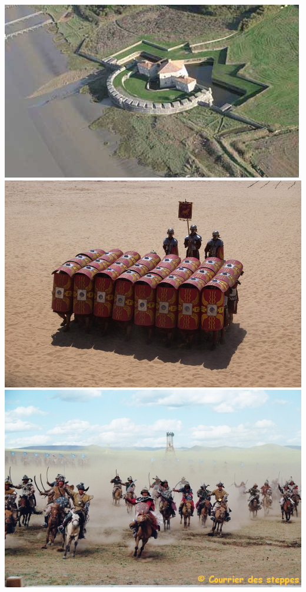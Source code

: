 \documentclass{article}
\begin{document}
\includegraphics[]{../ressources/Vauban_Fort_Lupin}
\includegraphics[width=\linewidth]{../ressources/tortue}
\includegraphics[width=\linewidth]{../ressources/mongol_army}
\end{document}
